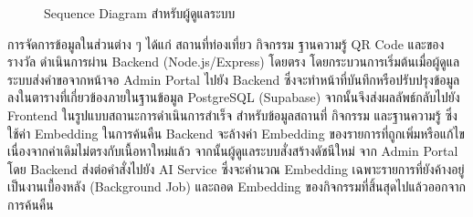 \begin{figure}[H]
\centering
{}
\caption{Sequence Diagram สำหรับผู้ดูแลระบบ}
\label{fig:sequence_admin}
\end{figure}

การจัดการข้อมูลในส่วนต่าง ๆ ได้แก่ สถานที่ท่องเที่ยว กิจกรรม ฐานความรู้ QR Code และของรางวัล ดำเนินการผ่าน Backend (Node.js/Express) โดยตรง โดยกระบวนการเริ่มต้นเมื่อผู้ดูแลระบบส่งคำขอจากหน้าจอ Admin Portal ไปยัง Backend ซึ่งจะทำหน้าที่บันทึกหรือปรับปรุงข้อมูลลงในตารางที่เกี่ยวข้องภายในฐานข้อมูล PostgreSQL (Supabase) จากนั้นจึงส่งผลลัพธ์กลับไปยัง Frontend ในรูปแบบสถานะการดำเนินการสำเร็จ สำหรับข้อมูลสถานที่ กิจกรรม และฐานความรู้ ซึ่งใช้ค่า Embedding ในการค้นคืน Backend จะล้างค่า Embedding ของรายการที่ถูกเพิ่มหรือแก้ไข เนื่องจากค่าเดิมไม่ตรงกับเนื้อหาใหม่แล้ว จากนั้นผู้ดูแลระบบสั่งสร้างดัชนีใหม่ จาก Admin Portal โดย Backend ส่งต่อคำสั่งไปยัง AI Service ซึ่งจะคำนวณ Embedding เฉพาะรายการที่ยังค้างอยู่เป็นงานเบื้องหลัง (Background Job) และถอด Embedding ของกิจกรรมที่สิ้นสุดไปแล้วออกจากการค้นคืน

